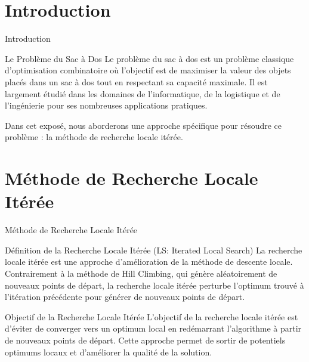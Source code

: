 \documentclass[11pt]{beamer}
\begin{document}
\section{Introduction}
\begin{frame}{Introduction}
   \begin{block}{Le Problème du Sac à Dos}
        Le problème du sac à dos est un problème classique d’optimisation combinatoire où l’objectif est de maximiser la valeur des objets placés dans un sac à dos tout en respectant sa capacité maximale. Il est largement étudié dans les domaines de l’informatique, de la logistique et de l’ingénierie pour ses nombreuses applications pratiques.
    \end{block}
    
    
        Dans cet exposé, nous aborderons une approche spécifique pour résoudre ce problème : la méthode de recherche locale itérée.
    
  
\end{frame}

\section{Méthode de Recherche Locale Itérée}
\begin{frame}{Méthode de Recherche Locale Itérée}
    \begin{block}{Définition de la Recherche Locale Itérée (LS: Iterated Local Search)}
        La recherche locale itérée est une approche d’amélioration de la méthode de descente locale. Contrairement à la méthode de Hill Climbing, qui génère aléatoirement de nouveaux points de départ, la recherche locale itérée perturbe l’optimum trouvé à l’itération précédente pour générer de nouveaux points de départ.
    \end{block}
    
    \begin{block}{Objectif de la Recherche Locale Itérée}
        L'objectif de la recherche locale itérée est d'éviter de converger vers un optimum local en redémarrant l’algorithme à partir de nouveaux points de départ. Cette approche permet de sortir de potentiels optimums locaux et d'améliorer la qualité de la solution.
    \end{block}
    
\end{frame}

\end{document}
